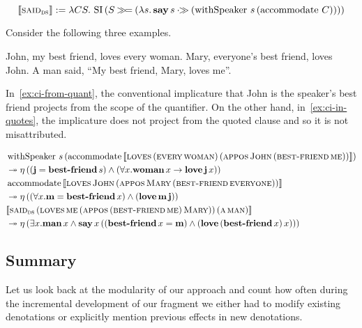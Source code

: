 \documentclass{llncs}
\newcommand{\negSpaceBeforeAlign}{\vspace{-4mm}}
\begin{document}
\negSpaceBeforeAlign

$$
  \llbracket \textsc{said}_{\textsc{ds}} \rrbracket := \lambda C S.\, \operatorname{SI}\,(S \mathbin{\gg\!=} (\lambda s.\, \textbf{say}\,s \mathbin{\cdot\!\!\gg} (\operatorname{withSpeaker}\,s\,(\operatorname{accommodate}\,C))))
$$

Consider the following three examples.

\begin{exe}
  \ex John, my best friend, loves every woman. \label{ex:ci-from-quant}
  \ex Mary, everyone's best friend, loves John. \label{ex:ci-with-quant}
  \ex A man said, ``My best friend, Mary, loves me''. \label{ex:ci-in-quotes}
\end{exe}

In~\eqref{ex:ci-from-quant}, the conventional implicature that John is the
speaker's best friend projects from the scope of the quantifier. On the
other hand, in~\eqref{ex:ci-in-quotes}, the implicature does not project
from the quoted clause and so it is not misattributed.

\negSpaceBeforeAlign

\begin{align}
  & \operatorname{withSpeaker}\,s\,(\operatorname{accommodate}\,\llbracket \textsc{loves}\,(\textsc{every}\,\textsc{woman})\,(\textsc{appos}\,\textsc{John}\,(\textsc{best-friend}\,\textsc{me})) \rrbracket) \nonumber \\
  & \twoheadrightarrow \eta\,((\textbf{j} = \textbf{best-friend}\,s) \land (\forall x. \textbf{woman}\,x \to \textbf{love}\,\textbf{j}\,x)) \\
  & \operatorname{accommodate}\,\llbracket \textsc{loves}\,\textsc{John}\,(\textsc{appos}\,\textsc{Mary}\,(\textsc{best-friend}\,\textsc{everyone})) \rrbracket \nonumber \\
  & \twoheadrightarrow \eta\,((\forall x. \textbf{m} = \textbf{best-friend}\,x) \land (\textbf{love}\,\textbf{m}\,\textbf{j})) \\
  & \llbracket \textsc{said}_{\textsc{ds}}\,(\textsc{loves}\,\textsc{me}\,(\textsc{appos}\,(\textsc{best-friend}\,\textsc{me})\,\textsc{Mary}))\,(\textsc{a}\,\textsc{man}) \rrbracket \nonumber \\
  & \twoheadrightarrow \eta\,(\exists x. \textbf{man}\,x \land \textbf{say}\,x\,((\textbf{best-friend}\,x = \textbf{m}) \land (\textbf{love}\,(\textbf{best-friend}\,x)\,x)))
\end{align}

\subsection{Summary}

Let us look back at the modularity of our approach and count how often
during the incremental development of our fragment we either had to modify
existing denotations or explicitly mention previous effects in new
denotations.
\end{document}
